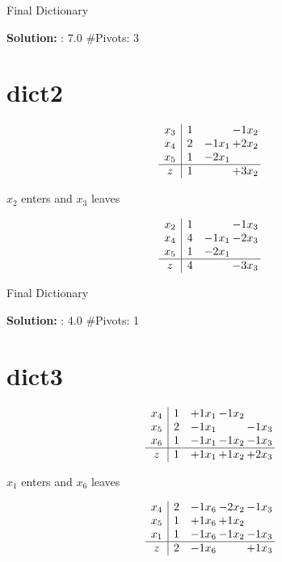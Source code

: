 \documentclass[10pt]{article}
\begin{document}
 Final Dictionary
\par \noindent\textbf{Solution:} :  7.0
\#Pivots:  3
\section{dict2}

\[\begin{array}{c| c c@{\hskip 2pt} c@{\hskip 2pt} }
 x_{3}   &  1  &   & -1  x_{2}\\
 x_{4}   &  2 & -1  x_{1} & + 2  x_{2}\\
 x_{5}   &  1 & -2  x_{1} &   \\
\hline
z    &  1  &   & + 3  x_{2}\\
\end{array}\]


 $ x_{2} $ enters and $ x_{3} $ leaves 

 \[\begin{array}{c| c c@{\hskip 2pt} c@{\hskip 2pt} }
 x_{2}   &  1  &   & -1  x_{3}\\
 x_{4}   &  4 & -1  x_{1} & -2  x_{3}\\
 x_{5}   &  1 & -2  x_{1} &   \\
\hline
z    &  4  &   & -3  x_{3}\\
\end{array}\]


 Final Dictionary
\par \noindent\textbf{Solution:} :  4.0
\#Pivots:  1
\section{dict3}

\[\begin{array}{c| c c@{\hskip 2pt} c@{\hskip 2pt} c@{\hskip 2pt} }
 x_{4}   &  1 & + 1  x_{1} & -1  x_{2} &   \\
 x_{5}   &  2 & -1  x_{1} &   & -1  x_{3}\\
 x_{6}   &  1 & -1  x_{1} & -1  x_{2} & -1  x_{3}\\
\hline
z    &  1 & + 1  x_{1} & + 1  x_{2} & + 2  x_{3}\\
\end{array}\]


 $ x_{1} $ enters and $ x_{6} $ leaves 

 \[\begin{array}{c| c c@{\hskip 2pt} c@{\hskip 2pt} c@{\hskip 2pt} }
 x_{4}   &  2 & -1  x_{6} & -2  x_{2} & -1  x_{3}\\
 x_{5}   &  1 & + 1  x_{6} & + 1  x_{2} &   \\
 x_{1}   &  1 & -1  x_{6} & -1  x_{2} & -1  x_{3}\\
\hline
z    &  2 & -1  x_{6} &   & + 1  x_{3}\\
\end{array}\]
\end{document}
